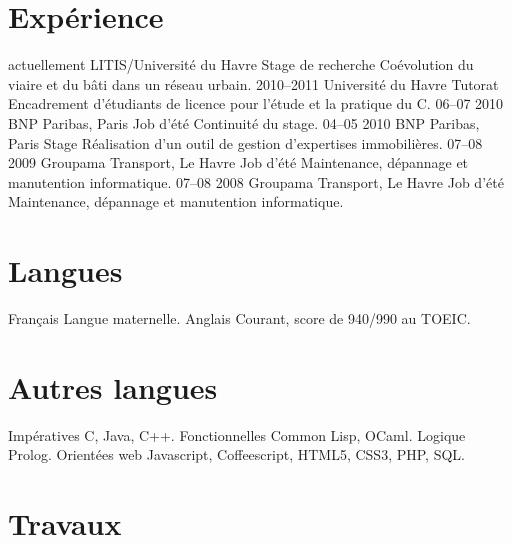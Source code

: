 \documentclass[]{friggeri-cv}
\begin{document}
\section{Expérience}

\begin{entrylist}
  \entry
    {actuellement}
    {LITIS/Université du Havre}
    {Stage de recherche}
    {Coévolution du viaire et du bâti dans un réseau urbain.}
  \entry
    {2010–2011}
    {Université du Havre}
    {Tutorat}
    {Encadrement d'étudiants de licence pour l'étude et la pratique du
    C.}
  \entry
    {06–07 2010}
    {BNP Paribas, Paris}
    {Job d'été}
    {Continuité du stage.}
  \entry
    {04–05 2010}
    {BNP Paribas, Paris}
    {Stage}
    {Réalisation d'un outil de gestion d'expertises immobilières.}
  \entry
    {07–08 2009}
    {Groupama Transport, Le Havre}
    {Job d'été}
    {Maintenance, dépannage et manutention informatique.}
  \entry
    {07–08 2008}
    {Groupama Transport, Le Havre}
    {Job d'été}
    {Maintenance, dépannage et manutention informatique.}
\end{entrylist}

\newpage

\section{Langues}

\begin{entrylist}
  \entry
    {}
    {Français}
    {}
    {Langue maternelle.}
  \entry
    {}
    {Anglais}
    {}
    {Courant, score de 940/990 au TOEIC.}
\end{entrylist}

\section{Autres langues}

\begin{entrylist}
  \entry
    {}
    {Impératives}
    {}
    {C, Java, C++.}
  \entry
    {}
    {Fonctionnelles}
    {}
    {Common Lisp, OCaml.}
  \entry
    {}
    {Logique}
    {}
    {Prolog.}
  \entry
    {}
    {Orientées web}
    {}
    {Javascript, Coffeescript, HTML5, CSS3, PHP, SQL.}
\end{entrylist}

\section{Travaux}
\end{document}
